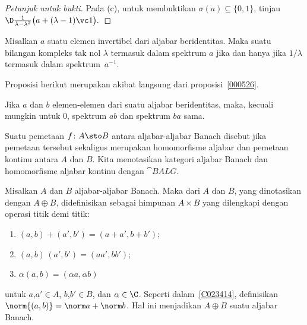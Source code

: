 \begin{proof}[\emph{Petunjuk untuk bukti}] Pada (c), untuk membuktikan $\sigma(a) \subseteq \{0,1\}$,
tinjau $\D \frac1{\lambda - \lambda^2}\bigl(a + (\lambda - 1)\vc 1\bigr).$ \ns
\end{proof}

\begin{prop} Misalkan $a$ suatu elemen invertibel dari aljabar beridentitas. Maka suatu bilangan kompleks
tak nol $\lambda$ termasuk dalam spektrum $a$ jika dan hanya jika $1/\lambda$ termasuk dalam
spektrum~$a^{-1}$.
\end{prop}

Proposisi berikut merupakan akibat langsung dari proposisi~\ref{000526}.

\begin{prop}\label{000575} Jika $a$ dan $b$ elemen-elemen dari suatu aljabar beridentitas, maka,
kecuali mungkin untuk $0$, spektrum $ab$ dan spektrum $ba$ sama.
\end{prop}

\begin{defn}\label{C035854} Suatu pemetaan $f \colon A \sto B$ antara aljabar-aljabar Banach disebut
 jika pemetaan tersebut sekaligus merupakan homomorfisme
aljabar dan pemetaan kontinu antara $A$ dan $B$. Kita menotasikan kategori
aljabar Banach dan homomorfisme aljabar kontinu dengan $\cat{BALG}$.
\end{defn}

\begin{prop} Misalkan $A$ dan $B$ aljabar-aljabar Banach. Maka
 dari $A$ dan $B$, yang dinotasikan dengan $A \oplus B$, didefinisikan sebagai himpunan $A
\times B$ yang dilengkapi dengan operasi titik demi titik:
   \begin{enumerate}[label=\rm{(\alph*)}]
     \item $(a,b) + (a',b') = (a + a',b + b')$;
     \item $(a,b)\,(a',b') = (aa',bb')$;
     \item $\alpha(a,b) = (\alpha a,\alpha b)$
   \end{enumerate}
untuk $a$,$a' \in A$, $b$,$b' \in B$, dan $\alpha \in \C$. Seperti dalam~\ref{C023414}, definisikan
$\norm{(a,b)} = \norm a + \norm b$. Hal ini menjadikan $A \oplus B$ suatu aljabar Banach.
\end{prop}

